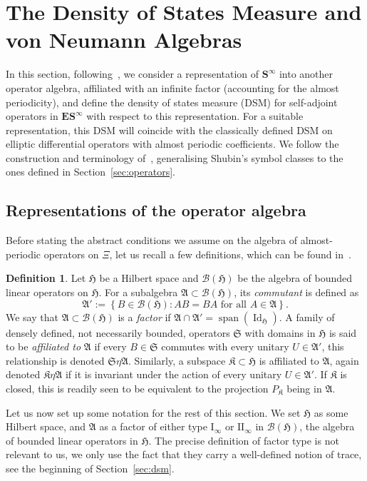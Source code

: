\documentclass[10pt]{amsart}
\theoremstyle{definition}\newtheorem{defi}[theo]{Definition}\newtheorem{rema}[theo]{Remark}\newtheorem{exam}[theo]{Example}\newtheorem{nota}[theo]{Notation}
\DeclareMathOperator{\spann}{span}
\DeclareMathOperator{\Id}{Id}
\newcommand{\rmI}{\mathrm{I}}
\newcommand{\rmII}{\mathrm{II}}
\newcommand{\CB}{\mathcal{B}}
\newcommand{\BE}{\mathbf E}
\newcommand{\BS}{\mathbf S}
\newcommand{\FA}{\mathfrak A}
\newcommand{\FH}{\mathfrak H}
\newcommand{\FK}{\mathfrak K}
\newcommand{\FS}{\mathfrak S}
\newcommand{\set}[1]{\left\{ #1 \right\}}
\begin{document}
\section{The Density of States Measure and von Neumann Algebras} \label{sec:ids}


In this section, following~\cite{Shubin1979a}, we consider a representation of $\BS^\infty$ into another operator algebra, affiliated with an infinite factor (accounting for the almost periodicity), and define the density of states measure (DSM) for self-adjoint operators in $\BE\BS^\infty$ with respect to this representation. For a suitable representation, this DSM will coincide with the classically defined DSM on elliptic differential operators with almost periodic coefficients. We follow the construction and terminology of~\cite[\S 1]{Shubin1979a}, generalising Shubin's symbol classes to the ones defined in Section~\ref{sec:operators}.

\subsection{Representations of the operator algebra}

Before stating the abstract conditions we assume on the algebra of almost-periodic operators on $\Xi$, let us recall a few definitions, which can be found in~\cite[\S 34--38]{Naimark}.
\begin{defi}\label{def:vNa}
Let $\FH$ be a Hilbert space and $\CB(\FH)$ be the algebra of bounded linear operators on $\FH$. For a subalgebra $\FA \subset \CB(\FH)$, its
\emph{commutant} is defined as
\begin{equation}
\FA' := \set{B \in \CB(\FH) : AB = BA \text{ for all } A \in \FA}.
\end{equation}
We say that $\FA \subset \CB(\FH)$ is a \emph{factor} if $\FA \cap \FA' =
\spann(\Id_\FH)$. A family of densely defined, not necessarily bounded, operators $\FS$ with domains in $\FH$ is said to be \emph{affiliated to} $\FA$ if every $B \in \FS$ commutes with every unitary $U \in \FA'$, this relationship is denoted $\FS \eta \FA$. Similarly, a subspace $\FK \subset
\FH$ is affiliated to $\FA$, again denoted $\FK \eta \FA$ if it is invariant under the action of every unitary $U \in \FA'$. If $\FK$ is closed, this is readily seen to be equivalent to the projection $P_{\FK}$ being in $\FA$.
\end{defi}

Let us now set up some notation for the rest of this section. We set $\FH$ as some Hilbert space, and $\FA$ as a factor of either type $\rmI_\infty$ or $\rmII_\infty$ in $\CB(\FH)$, the algebra of bounded linear operators in $\FH$. The precise definition of factor type is not relevant to us, we only use the fact that they carry a well-defined notion of trace, see the beginning of Section~\ref{sec:dsm}.
\end{document}
